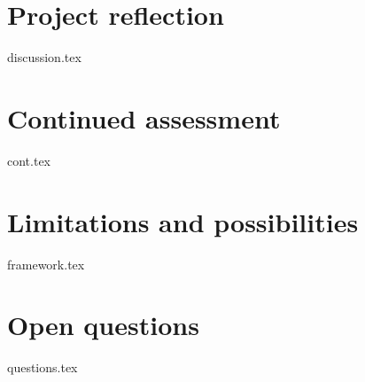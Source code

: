 











\section{Project reflection}\label{sec:whatif:discussion}
    {{discussion.tex}}


\section{Continued assessment}\label{sec:whatif:cont}
    {{cont.tex}}


\section{Limitations and possibilities}\label{sec:whatif:framework}
    {{framework.tex}}


\section{Open questions}\label{sec:whatif:questions}
    {{questions.tex}}





    

